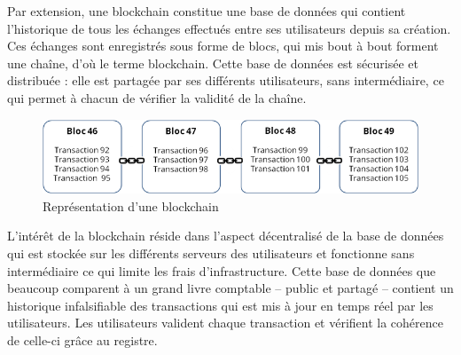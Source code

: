 \documentclass[conference]{IEEEtran}
\begin{document}
Par extension, une blockchain constitue une base de données qui contient l’historique de tous les échanges effectués entre ses utilisateurs depuis sa création. Ces échanges sont enregistrés sous forme de blocs, qui mis bout à bout forment une chaîne, d'où le terme blockchain. Cette base de données est sécurisée et distribuée : elle est partagée par ses différents utilisateurs, sans intermédiaire, ce qui permet à chacun de vérifier la validité de la chaîne. \cite{bcfr} \\
\begin{figure}
    \centering
    \includegraphics[scale=0.55]{blck-schema.png}
    \caption{Représentation d'une blockchain}
    \label{fig:blockchain}
\end{figure}

L’intérêt de la blockchain réside dans l’aspect décentralisé de la base de données qui est stockée sur les différents serveurs des utilisateurs et fonctionne sans intermédiaire ce qui limite les frais d’infrastructure. Cette base de données que beaucoup comparent à un grand livre comptable – public et partagé – contient un historique infalsifiable des transactions qui est mis à jour en temps réel par les utilisateurs. Les utilisateurs valident chaque transaction et vérifient la cohérence de celle-ci grâce au registre. \\
\end{document}
